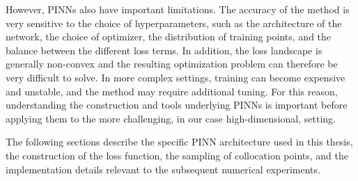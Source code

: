 However, PINNs also have important limitations.
The accuracy of the method is very sensitive to the choice of hyperparameters, such as
the architecture of the network,
the choice of optimizer,
the distribution of training points,
and the balance between the different loss terms.
In addition, the loss landscape is generally non-convex and the resulting optimization problem can therefore be very difficult to solve.
In more complex settings,
training can become expensive and unstable, and
the method may require additional tuning.
For this reason, understanding the
construction and tools underlying PINNs is important before applying them
to the more challenging, in our case
high-dimensional, setting.

The following sections describe the specific PINN architecture used in this
thesis, the construction of the loss function, the sampling of collocation points,
and the implementation details relevant to the subsequent numerical experiments.


%
%


